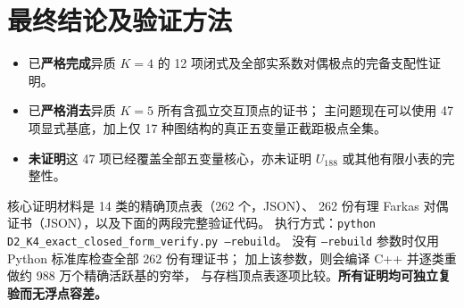 \documentclass[11pt,a4paper]{ctexart}
\theoremstyle{remark}\newtheorem{remark}[theorem]{备注}
\begin{document}
\section{最终结论及验证方法}
\begin{itemize}
\item 已\textbf{严格完成}异质 $K=4$ 的 12 项闭式及全部实系数对偶极点的完备支配性证明。
\item 已\textbf{严格消去}异质 $K=5$ 所有含孤立交互顶点的证书；
主问题现在可以使用 47 项显式基底，加上仅 17 种图结构的真正五变量正截距极点全集。
\item \textbf{未证明}这 47 项已经覆盖全部五变量核心，亦未证明
$U_{188}$ 或其他有限小表的完整性。
\end{itemize}
核心证明材料是 14 类的精确顶点表（262 个，JSON）、
262 份有理 Farkas 对偶证书（JSON），以及下面的两段完整验证代码。
执行方式：\texttt{python D2\_K4\_exact\_closed\_form\_verify.py --rebuild}。
没有 \texttt{--rebuild} 参数时仅用 Python 标准库检查全部 262 份有理证书；
加上该参数，则会编译 C++ 并逐类重做约 988 万个精确活跃基的穷举，
与存档顶点表逐项比较。\textbf{所有证明均可独立复验而无浮点容差。}

\appendix
\end{document}
